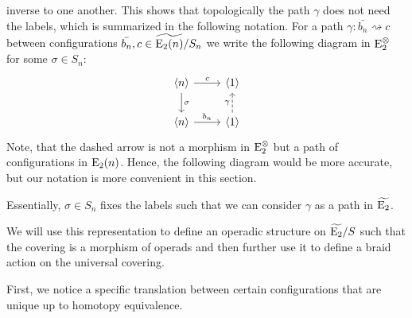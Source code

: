 \begin{const}
inverse to one another. This shows that topologically the path $\gamma$ does not
need the labels, which is summarized in the following notation. For a path
$\gamma \colon \bar{b_n} \rightsquigarrow c$ between configurations $\bar{b_n},
c \in \widetilde{\operatorname{E}_2(n)} \slash S_n$ we write the following diagram in $\operatorname{\operatorname{E}_2^{\otimes}}$ for some
$\sigma \in S_n$:
\[    
    \begin{tikzcd}
        \langle n \rangle \arrow[r, "c"] \arrow[d, "\sigma"] & \langle 1 \rangle  \\
        \langle n \rangle  \arrow[r, "b_n"]                  & \langle 1 \rangle  \arrow[u, dashed, "\gamma"]              
    \end{tikzcd}
\]
Note, that the dashed arrow is not a morphism in $\operatorname{\operatorname{E}_2^{\otimes}}$ but a path of
configurations in $\operatorname{E}_2(n)$. Hence, the following diagram would be more
accurate, but our notation is more convenient in this section.
\begin{center}
\end{center}
Essentially, $\sigma \in S_n$ fixes the labels such that we can consider
$\gamma$ as a path in $\widetilde{\operatorname{E}_2}$.
\end{const}

We will use this representation to define an operadic structure on
$\widetilde{\operatorname{E}_2} \slash S$ such that the covering is a morphism of operads and
then further use it to define a braid action on the universal covering.

First, we notice a specific translation between certain configurations that are
unique up to homotopy equivalence.

